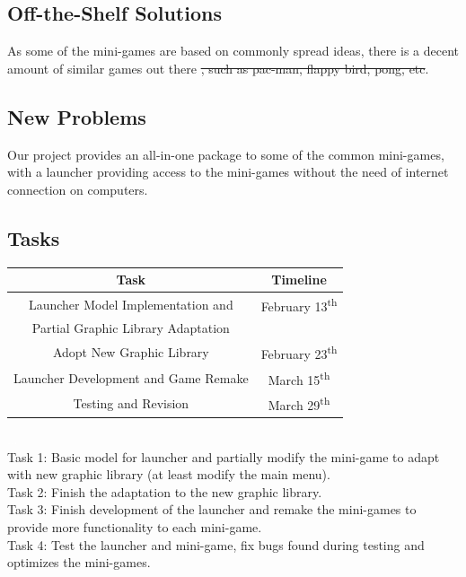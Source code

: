 \documentclass[12pt, titlepage]{article}
\begin{document}
\subsection{Off-the-Shelf Solutions}

As some of the mini-games are based on commonly spread ideas, there is a decent amount of similar games out there \sout{, such as pac-man, flappy bird, pong, etc}.

\subsection{New Problems}

Our project provides an all-in-one package to some of the common mini-games, with a launcher providing access to the mini-games without the need of internet connection on computers.

\subsection{Tasks}

\begin{center}
\begin{tabular}{ |c|c| } 
\hline
\textbf{Task} & \textbf{Timeline}\\
\hline
Launcher Model Implementation and  & February 13\textsuperscript{th}\\
Partial Graphic Library Adaptation &\\
\hline
Adopt New Graphic Library & February 23\textsuperscript{th}\\
\hline
Launcher Development and Game Remake & March 15\textsuperscript{th}\\
\hline
Testing and Revision & March 29\textsuperscript{th}\\
\hline
\end{tabular}
\end{center}

\textcolor{white}{...}\\ %
Task 1: Basic model for launcher and partially modify the mini-game to adapt with new graphic library (at least modify the main menu).\\
Task 2: Finish the adaptation to the new graphic library.\\
Task 3: Finish development of the launcher and remake the mini-games to provide more functionality to each mini-game.\\
Task 4: Test the launcher and mini-game, fix bugs found during testing and optimizes the mini-games.
\end{document}
